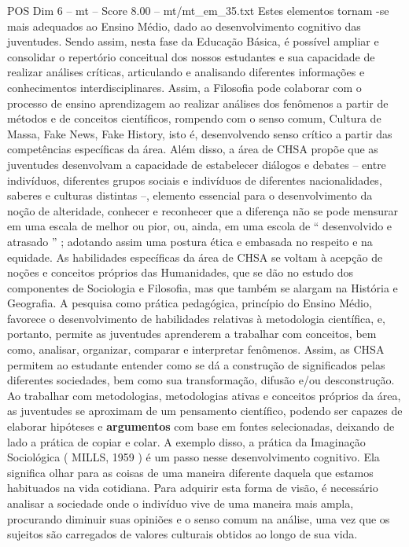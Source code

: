 \begin{textsample}{POS Dim 6 – mt – Score 8.00 – mt/mt\_em\_35.txt}
Estes elementos tornam -se mais adequados ao Ensino Médio, dado ao desenvolvimento cognitivo das juventudes.
Sendo assim, nesta fase da Educação Básica, é possível ampliar e consolidar o repertório conceitual dos nossos estudantes e sua capacidade de realizar análises críticas, articulando e analisando diferentes informações e conhecimentos interdisciplinares.
Assim, a Filosofia pode colaborar com o processo de ensino aprendizagem ao realizar análises dos fenômenos a partir de métodos e de conceitos científicos, rompendo com o senso comum, Cultura de Massa, Fake News, Fake History, isto é, desenvolvendo senso crítico a partir das competências específicas da área.
Além disso, a área de CHSA propõe que as juventudes desenvolvam a capacidade de estabelecer diálogos e debates – entre indivíduos, diferentes grupos sociais e indivíduos de diferentes nacionalidades, saberes e culturas distintas –, elemento essencial para o desenvolvimento da noção de alteridade, conhecer e reconhecer que a diferença não se pode mensurar em uma escala de melhor ou pior, ou, ainda, em uma escola de “ desenvolvido e atrasado ” ; adotando assim uma postura ética e embasada no respeito e na equidade.
As habilidades específicas da área de CHSA se voltam à acepção de noções e conceitos próprios das Humanidades, que se dão no estudo dos componentes de Sociologia e Filosofia, mas que também se alargam na História e Geografia.
A pesquisa como prática pedagógica, princípio do Ensino Médio, favorece o desenvolvimento de habilidades relativas à metodologia científica, e, portanto, permite as juventudes aprenderem a trabalhar com conceitos, bem como, analisar, organizar, comparar e interpretar fenômenos.
Assim, as CHSA permitem ao estudante entender como se dá a construção de significados pelas diferentes sociedades, bem como sua transformação, difusão e/ou desconstrução.
Ao trabalhar com metodologias, metodologias ativas e conceitos próprios da área, as juventudes se aproximam de um pensamento científico, podendo ser capazes de elaborar hipóteses e \textbf{argumentos} com base em fontes selecionadas, deixando de lado a prática de copiar e colar.
A exemplo disso, a prática da Imaginação Sociológica ( MILLS, 1959 ) é um passo nesse desenvolvimento cognitivo.
Ela significa olhar para as coisas de uma maneira diferente daquela que estamos habituados na vida cotidiana.
Para adquirir esta forma de visão, é necessário analisar a sociedade onde o indivíduo vive de uma maneira mais ampla, procurando diminuir suas opiniões e o senso comum na análise, uma vez que os sujeitos são carregados de valores culturais obtidos ao longo de sua vida.

\end{textsample}
